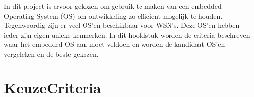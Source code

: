 \documentclass{../local}
\begin{document}
In dit project is ervoor gekozen om gebruik te maken van een embedded Operating System (OS) om ontwikkeling zo efficient mogelijk te houden. Tegenwoordig zijn er veel OS'en beschikbaar voor WSN's. Deze OS'en hebben ieder zijn eigen unieke kenmerken. In dit hoofdstuk worden de criteria beschreven waar het embedded OS aan moet voldoen en worden de kandidaat OS'en vergeleken en de beste gekozen.

\section{KeuzeCriteria}
\end{document}
